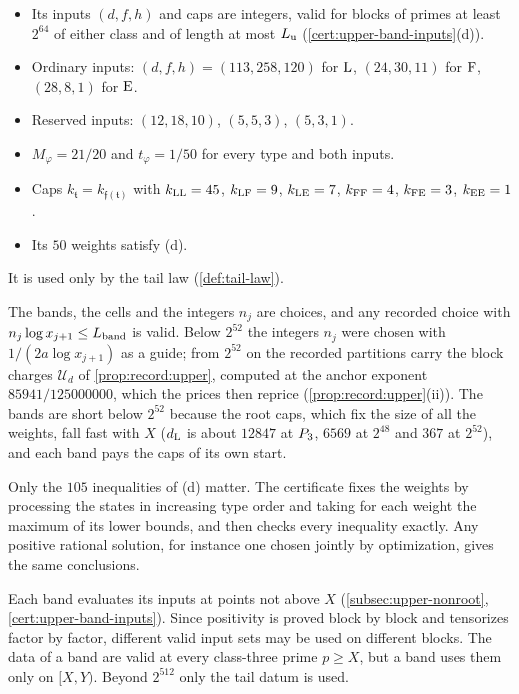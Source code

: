 \begin{definition}
\begin{enumerate}[label=(\alph*)]
\begin{itemize}
 \item Its inputs $(d,f,h)$ and caps are integers, valid for blocks of primes at
  least $2^{64}$ of either class and of length at most $L_{\rm u}$
  (\cref{cert:upper-band-inputs}(d)).
 \item Ordinary inputs: $(d,f,h)=(113,258,120)$ for $\rm L$, $(24,30,11)$ for $\rm F$,
  $(28,8,1)$ for $\rm E$.
 \item Reserved inputs: $(12,18,10)$, $(5,5,3)$, $(5,3,1)$.
 \item $M_\varphi=21/20$ and $t_\varphi=1/50$ for every type and both inputs.
 \item Caps $k_{\mathfrak t}=k_{\mathfrak f(\mathfrak t)}$ with $k_{\rm LL}=45$,
  $k_{\rm LF}=9$, $k_{\rm LE}=7$, $k_{\rm FF}=4$, $k_{\rm FE}=3$, $k_{\rm EE}=1$.
 \item Its $50$ weights satisfy (d).
 \end{itemize}
 It is used only by the tail law (\cref{def:tail-law}).
\end{enumerate}
\end{definition}

\begin{remark}\label{rem:upper-band-choices}
The bands, the cells and the integers $n_j$ are choices, and any recorded choice
with $n_j\log x_{j+1}\le L_{\rm band}$ is valid. Below $2^{52}$ the integers $n_j$
were chosen with $1/(2a\log x_{j+1})$ as a guide; from $2^{52}$ on the
recorded partitions carry the block
charges $\mathcal U_d$ of \cref{prop:record:upper}, computed at
the anchor exponent $85941/125000000$, which the prices then
reprice (\cref{prop:record:upper}(ii)).
The bands are short below $2^{52}$ because the root caps, which fix the size of all
the weights, fall fast with $X$ ($d_{\rm L}$ is about $12847$ at $P_3$, $6569$
at $2^{48}$ and $367$ at $2^{52}$), and each band pays the caps of its own start.

Only the $105$ inequalities of (d) matter. The certificate fixes the weights by
processing the states in increasing type order and taking for each weight the
maximum of its lower bounds, and then checks every inequality exactly. Any
positive rational solution, for instance one chosen jointly by optimization, gives
the same conclusions.

Each band evaluates its inputs at points not above $X$
(\cref{subsec:upper-nonroot}, \cref{cert:upper-band-inputs}). Since positivity is
proved block by block and tensorizes factor by factor, different valid input sets
may be used on different blocks. The data of a band are valid at every
class-three prime $p\ge X$, but a band uses them only on $[X,Y)$. Beyond $2^{512}$
only the tail datum is used.
\end{remark}

